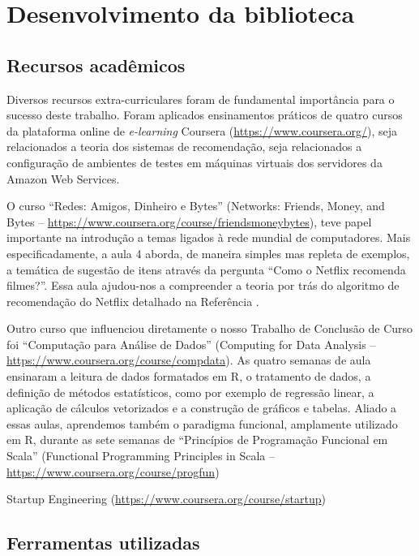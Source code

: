 \chapter{Desenvolvimento da biblioteca} %
\label{cha:desenvolvimento_da_biblioteca}

\section{Recursos acadêmicos} %
\label{sec:recursos_acad_micos}

Diversos recursos extra-curriculares foram de fundamental importância para o sucesso deste trabalho. Foram aplicados ensinamentos práticos de quatro cursos da plataforma online de \textit{e-learning} Coursera (\url{https://www.coursera.org/}), seja relacionados a teoria dos sistemas de recomendação, seja relacionados a configuração de ambientes de testes em máquinas virtuais dos servidores da Amazon Web Services.

O curso ``Redes: Amigos, Dinheiro e Bytes'' (Networks: Friends, Money, and Bytes -- \url{https://www.coursera.org/course/friendsmoneybytes}), teve papel importante na introdução a temas ligados à rede mundial de computadores. Mais especificadamente, a aula 4 aborda, de maneira simples mas repleta de exemplos, a temática de sugestão de itens através da pergunta ``Como o Netflix recomenda filmes?''. Essa aula ajudou-nos a compreender a teoria por trás do algoritmo de recomendação do Netflix detalhado na Referência .


Outro curso que influenciou diretamente o nosso Trabalho de Conclusão de Curso foi ``Computação para Análise de Dados'' (Computing for Data Analysis -- \url{https://www.coursera.org/course/compdata}). As quatro semanas de aula ensinaram a leitura de dados formatados em R, o tratamento de dados, a definição de métodos estatísticos, como por exemplo de regressão linear, a aplicação de cálculos vetorizados e a construção de gráficos e tabelas. Aliado a essas aulas, aprendemos também o paradigma funcional, amplamente utilizado em R, durante as sete semanas de ``Princípios de Programação Funcional em Scala'' (Functional Programming Principles in Scala -- \url{https://www.coursera.org/course/progfun}) 

Startup Engineering (\url{https://www.coursera.org/course/startup})

\section{Ferramentas utilizadas} %
\label{sec:ferramentas_utilizadas}

